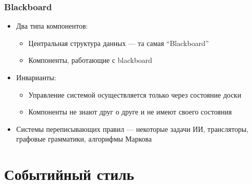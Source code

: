 \documentclass{../cscslides}
\begin{document}
    \begin{frame}
        \frametitle{Blackboard}
        \begin{itemize}
            \item Два типа компонентов:
            \begin{itemize}
                \item Центральная структура данных --- та самая ``Blackboard''
                \item Компоненты, работающие с blackboard
            \end{itemize}
            \item Инварианты:
            \begin{itemize}
                \item Управление системой осуществляется только через состояние доски
                \item Компоненты не знают друг о друге и не имеют своего состояния
            \end{itemize}
            \item Системы переписывающих правил --- некоторые задачи ИИ, трансляторы, графовые грамматики, алгорифмы Маркова
        \end{itemize}
    \end{frame}

    \section{Событийный стиль}
\end{document}
